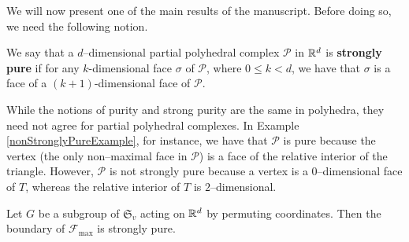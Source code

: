 We will now present one of the main results of the manuscript. Before doing so, we need the following notion.

\begin{defn}
We say that a $d$--dimensional partial polyhedral complex $\mathcal{P}$ in $\mathbb{R}^d$ is \textbf{strongly pure} if for any $k$-dimensional face $\sigma$ of $\mathcal{P}$, where $0 \le k < d$, we have that $\sigma$ is a face of a $(k + 1)$-dimensional face of $\mathcal{P}$.
\end{defn}

While the notions of purity and strong purity are the same in polyhedra, they need not agree for partial polyhedral complexes. In Example \ref{nonStronglyPureExample}, for instance, we have that $\mathcal{P}$ is pure because the vertex (the only non--maximal face in $\mathcal{P}$) is a face of the relative interior of the triangle. However, $\mathcal{P}$ is not strongly pure because a vertex is a $0$--dimensional face of $T$, whereas the relative interior of $T$ is $2$--dimensional.

\begin{thm}\label{stronglyPure}
Let $G$ be a subgroup of \(\mathfrak{S}_v\) acting on $\mathbb{R}^d$ by permuting coordinates. Then the boundary of $\mathcal{F}_{\max}$ is strongly pure.
\end{thm}

